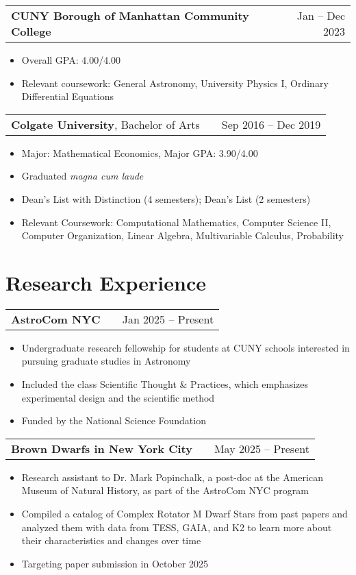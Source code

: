 \documentclass[a4paper,12pt]{article}
\makeatletter
\newenvironment{joblong}[2]
    {
    \begin{tabularx}{\linewidth}{@{}l X r@{}}
    #1 & \hfill &  #2 \\[3.75pt]
    \end{tabularx}
    \begin{minipage}[t]{\linewidth}
    \begin{itemize}[nosep,after=\strut, leftmargin=1em, itemsep=3pt,label=--]
    }
    {
    \end{itemize}
    \end{minipage}    
    }
\makeatother
\begin{document}
\begin{joblong}{\textbf{CUNY Borough of Manhattan Community College}}{Jan -- Dec 2023}
\item Overall GPA: 4.00/4.00
\item Relevant coursework: General Astronomy, University Physics I, Ordinary Differential Equations
\end{joblong}

\begin{joblong}{\textbf{Colgate University}, Bachelor of Arts}{Sep 2016 -- Dec 2019}
\item Major: Mathematical Economics, Major GPA: 3.90/4.00
\item Graduated \textit{magna cum laude}
\item Dean's List with Distinction (4 semesters); Dean's List (2 semesters)
\item Relevant Coursework: Computational Mathematics, Computer Science II, Computer Organization, Linear Algebra, Multivariable Calculus, Probability
\end{joblong}


\section{Research Experience}

\begin{joblong}{\textbf{AstroCom NYC}}{Jan 2025 -- Present}
\item Undergraduate research fellowship for students at CUNY schools interested in pursuing graduate studies in Astronomy
\item Included the class Scientific Thought \& Practices, which emphasizes experimental design and the scientific method
\item Funded by the National Science Foundation
\end{joblong}

\begin{joblong}{\textbf{Brown Dwarfs in New York City}}{May 2025 -- Present}
\item Research assistant to Dr. Mark Popinchalk, a post-doc at the American Museum of Natural History, as part of the AstroCom NYC program
\item Compiled a catalog of Complex Rotator M Dwarf Stars from past papers and analyzed them with data from TESS, GAIA, and K2 to learn more about their characteristics and changes over time
\item Targeting paper submission in October 2025
\end{joblong}
\end{document}
